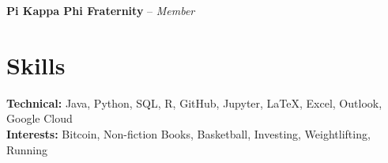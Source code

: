 \documentclass[11pt]{article}
\begin{document}
\vspace{0.1em}

\begin{adjustwidth}{0.5em}{0em}
\textbf{Pi Kappa Phi Fraternity} -- \textit{Member}
\end{adjustwidth}

\vspace{0.1em}


\section*{Skills}
\textbf{Technical:} Java, Python, SQL, R, GitHub, Jupyter, LaTeX, Excel, Outlook, Google Cloud\\ 
\textbf{Interests:} Bitcoin, Non-fiction Books, Basketball, Investing, Weightlifting, Running 
\end{document}

